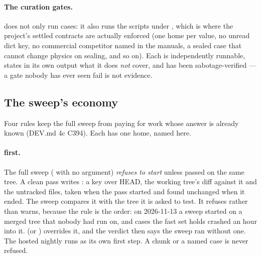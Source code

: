 \documentclass[11pt,a4paper]{article}
\begin{document}
\paragraph{The curation gates.}   does not only run cases: it
also runs the  scripts under , which is
where the project's settled contracts are actually enforced (one home per
value, no unread dict key, no commercial competitor named in the manuals, a
sealed case that cannot change physics on sealing, and so on).  Each is
independently runnable, states in its own output what it does \emph{not}
cover, and has been sabotage-verified --- a gate nobody has ever seen fail
is not evidence.

\subsection{The sweep's economy}\label{sec:suite-economy}

Four rules keep the full sweep from paying for work whose answer is already
known (DEV.md 4c C394).  Each has one home, named here.

\paragraph{ first.}  The full sweep ( with no
argument) \emph{refuses to start} unless  passed on
the same tree.  A clean  pass writes :
a key over HEAD, the working tree's diff against it and the untracked files,
taken when the pass started and found unchanged when it ended.  The sweep
compares it with the tree it is asked to test.  It refuses rather than warns,
because the rule is the order: on 2026-11-13 a sweep started on a merged tree
that nobody had run  on, and cases the fast set holds crashed an
hour into it.   (or )
overrides it, and the verdict then says the sweep ran without one.  The hosted
nightly runs  as its own first step.  A chunk or a named case is
never refused.
\end{document}
